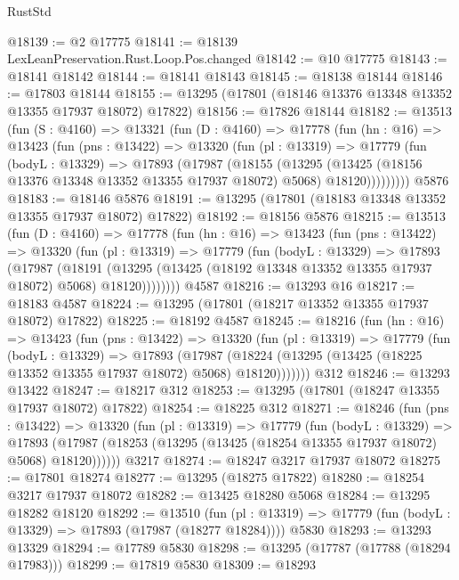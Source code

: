 \begin{lexlean}{RustStd}
\begin{coremodule}
@18139 := @2 @17775
@18141 := @18139 LexLeanPreservation.Rust.Loop.Pos.changed
@18142 := @10 @17775
@18143 := @18141 @18142
@18144 := @18141 @18143
@18145 := @18138 @18144
@18146 := @17803 @18144
@18155 := @13295 (@17801 (@18146 @13376 @13348 @13352 @13355 @17937 @18072) @17822)
@18156 := @17826 @18144
@18182 := @13513
    (fun (S : @4160) =>
    @13321
      (fun (D : @4160) =>
      @17778
        (fun (hn : @16) =>
        @13423
          (fun (pns : @13422) =>
          @13320
            (fun (pl : @13319) =>
            @17779
              (fun (bodyL : @13329) =>
              @17893
                (@17987
                  (@18155
                    (@13295
                      (@13425 (@18156 @13376 @13348 @13352 @13355 @17937 @18072) @5068)
                      @18120)))))))))
    @5876
@18183 := @18146 @5876
@18191 := @13295 (@17801 (@18183 @13348 @13352 @13355 @17937 @18072) @17822)
@18192 := @18156 @5876
@18215 := @13513
    (fun (D : @4160) =>
    @17778
      (fun (hn : @16) =>
      @13423
        (fun (pns : @13422) =>
        @13320
          (fun (pl : @13319) =>
          @17779
            (fun (bodyL : @13329) =>
            @17893
              (@17987
                (@18191
                  (@13295 (@13425 (@18192 @13348 @13352 @13355 @17937 @18072) @5068) @18120))))))))
    @4587
@18216 := @13293 @16
@18217 := @18183 @4587
@18224 := @13295 (@17801 (@18217 @13352 @13355 @17937 @18072) @17822)
@18225 := @18192 @4587
@18245 := @18216
    (fun (hn : @16) =>
    @13423
      (fun (pns : @13422) =>
      @13320
        (fun (pl : @13319) =>
        @17779
          (fun (bodyL : @13329) =>
          @17893
            (@17987
              (@18224 (@13295 (@13425 (@18225 @13352 @13355 @17937 @18072) @5068) @18120)))))))
    @312
@18246 := @13293 @13422
@18247 := @18217 @312
@18253 := @13295 (@17801 (@18247 @13355 @17937 @18072) @17822)
@18254 := @18225 @312
@18271 := @18246
    (fun (pns : @13422) =>
    @13320
      (fun (pl : @13319) =>
      @17779
        (fun (bodyL : @13329) =>
        @17893 (@17987 (@18253 (@13295 (@13425 (@18254 @13355 @17937 @18072) @5068) @18120))))))
    @3217
@18274 := @18247 @3217 @17937 @18072
@18275 := @17801 @18274
@18277 := @13295 (@18275 @17822)
@18280 := @18254 @3217 @17937 @18072
@18282 := @13425 @18280 @5068
@18284 := @13295 @18282 @18120
@18292 := @13510
    (fun (pl : @13319) => @17779 (fun (bodyL : @13329) => @17893 (@17987 (@18277 @18284))))
    @5830
@18293 := @13293 @13329
@18294 := @17789 @5830
@18298 := @13295 (@17787 (@17788 (@18294 @17983)))
@18299 := @17819 @5830
@18309 := @18293

\end{coremodule}
\end{lexlean}
